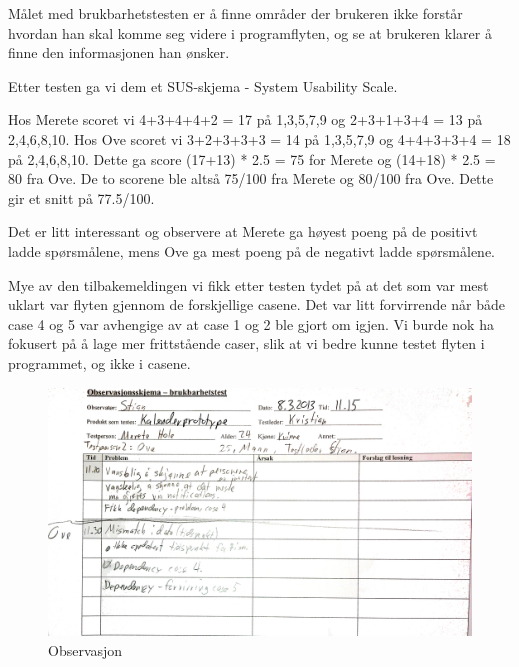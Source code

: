 Målet med brukbarhetstesten er å finne områder der brukeren ikke forstår hvordan
han skal komme seg videre i programflyten, og se at brukeren klarer å finne
den informasjonen han ønsker.

Etter testen ga vi dem et SUS-skjema - System Usability Scale.

Hos Merete scoret vi 4+3+4+4+2 = 17 på 1,3,5,7,9 og 2+3+1+3+4 = 13 på
2,4,6,8,10. Hos Ove scoret vi 3+2+3+3+3 = 14 på 1,3,5,7,9 og 4+4+3+3+4 = 18 på
2,4,6,8,10. Dette ga score (17+13) * 2.5 = 75 for Merete og (14+18) * 2.5 = 80
fra Ove. De to scorene ble altså 75/100 fra Merete og 80/100 fra Ove. Dette gir
et snitt på 77.5/100.

Det er litt interessant og observere at Merete ga høyest poeng på de positivt
ladde spørsmålene, mens Ove ga mest poeng på de negativt ladde spørsmålene.

Mye av den tilbakemeldingen vi fikk etter testen tydet på at det som var mest
uklart var flyten gjennom de forskjellige casene. Det var litt forvirrende når
både case 4 og 5 var avhengige av at case 1 og 2 ble gjort om igjen. Vi burde
nok ha fokusert på å lage mer frittstående caser, slik at vi bedre kunne testet
flyten i programmet, og ikke i casene.

\begin{figure}[obs]
\centering
\includegraphics[width=160mm]{images/observasjon.jpg}
\caption{Observasjon}
\label{overflow}
\end{figure}

